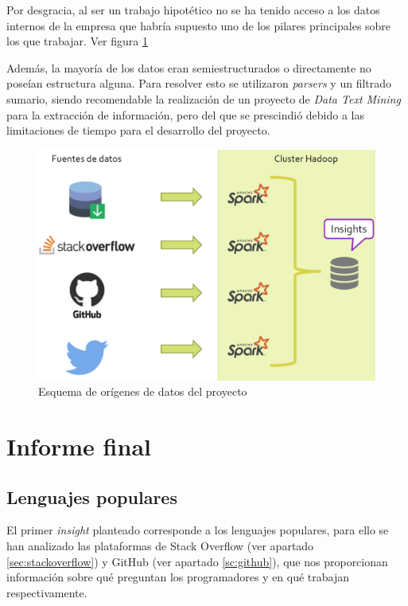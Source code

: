 Por desgracia, al ser un trabajo hipotético no se ha tenido acceso a los datos internos de la empresa que habría supuesto uno de los pilares principales sobre los que trabajar. Ver figura \ref{DataSources} 

Además, la mayoría de los datos eran semiestructurados o directamente no poseían estructura alguna. Para resolver esto se utilizaron \textit{parsers} y un filtrado sumario, siendo recomendable la realización de un proyecto de \textit{Data Text Mining} para la extracción de información, pero del que se prescindió debido a las limitaciones de tiempo para el desarrollo del proyecto.

\begin{figure}[htp!]
	\centering
	\caption{Esquema de orígenes de datos del proyecto}
	\label{DataSources}
	\vspace{5pt}
	\includegraphics[scale=0.41]{graphics/dataSources}
\end{figure}

\clearpage
\section{Informe final}
\subsection{Lenguajes populares}
El primer \textit{insight} planteado corresponde a los lenguajes populares, para ello se han analizado las plataformas de Stack Overflow \cite{stackoverflow} (ver apartado \ref{sec:stackoverflow}) y GitHub \cite{github} (ver apartado \ref{sc:github}), que nos proporcionan información sobre qué preguntan los programadores y en qué trabajan respectivamente.

